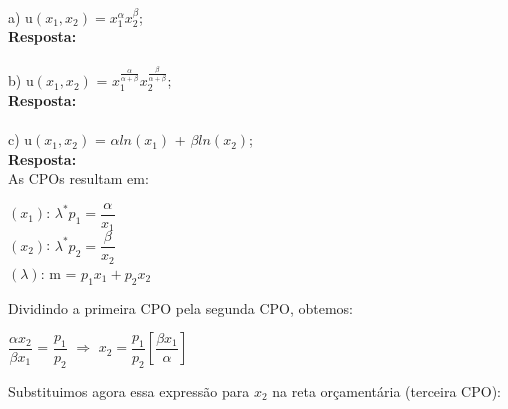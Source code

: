\begin{enumerate}
\paragraph{} a) u{$(x_1, x_2) = x^\alpha_1 x^\beta_2$};\\

\textbf{Resposta:}\\

\paragraph{} b) u{$(x_{1},x_{2})$} = {$x_{1}^{\frac{\alpha}{\alpha + \beta}}$}{$x_{2}^{\frac{\beta}{\alpha + \beta}}$};\\

\textbf{Resposta:}\\

\paragraph{} c) u{$(x_1, x_2)$} = {$\alpha ln(x_1)$} + {$\beta ln(x_2)$}; \\

\textbf{Resposta:}\\

As CPOs resultam em:

\begin{center}

{$(x_1)$}: {$\lambda^{*}p_{1} = \dfrac{\alpha}{x_{1}}$}
\\

{$(x_2)$}: {$\lambda^{*}p_{2} = \dfrac{\beta}{x_{2}}$}
\\

{$(\lambda)$}: m = {$p_{1}x_{1}+p_{2}x_{2}$}

\end{center}

Dividindo a primeira CPO pela segunda CPO, obtemos:

\begin{center}

{$\dfrac{\alpha x_{2}}{\beta x_{1}}$} = {$\dfrac{p_{1}}{p_{2}}$} {$\Rightarrow$} {$x_2 =\dfrac{p_1}{p_2}\left[\dfrac{\beta x_{1}}{\alpha}\right]$}\\

\end{center}

Substituimos agora essa expressão para {$x_2$} na reta orçamentária (terceira CPO):\\

\begin{center}


\end{center}
\end{enumerate}
